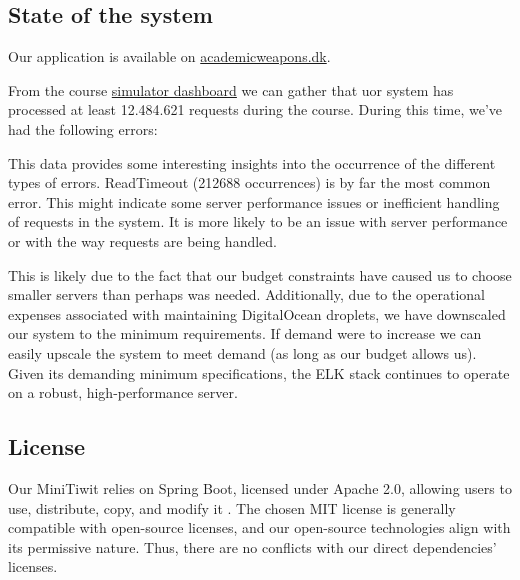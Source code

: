 \subsection{State of the system}
Our application is available on \href{https://academicweapons.dk/}{academicweapons.dk}. 

From the course \href{146.190.207.33:3000}{simulator dashboard} we can gather that uor system has processed at least 12.484.621 requests during the course. During this time, we've had the following errors:

\begin{center}
\end{center}
This data provides some interesting insights into the occurrence of the different types of errors. ReadTimeout (212688 occurrences) is by far the most common error. This might indicate some server performance issues or inefficient handling of requests in the system. It is more likely to be an issue with server performance or with the way requests are being handled. 

This is likely due to the fact that our budget constraints have caused us to choose smaller servers than perhaps was needed. Additionally, due to the operational expenses associated with maintaining DigitalOcean droplets, we have downscaled our system to the minimum requirements. If demand were to increase we can easily upscale the system to meet demand (as long as our budget allows us). Given its demanding minimum specifications, the ELK stack continues to operate on a robust, high-performance server. 


\subsection{License}
Our MiniTiwit relies on Spring Boot, licensed under Apache 2.0, allowing users to use, distribute, copy, and modify it \parencite{license}. The chosen MIT license is generally compatible with open-source licenses, and our open-source technologies align with its permissive nature. Thus, there are no conflicts with our direct dependencies' licenses.